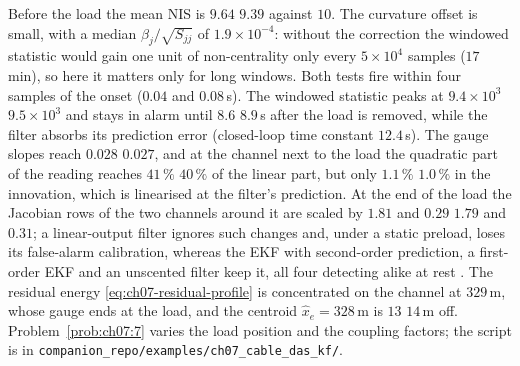 \documentclass[graybox,envcountchap]{style/SNmono}
\newcommand{\repopath}[1]{\texttt{#1}}
\providecommand{\DIFadd}[1]{{\protect\color{blue} #1}} %
\providecommand{\DIFdel}[1]{{\protect\color{red} #1}} %
\providecommand{\DIFaddbegin}{} %
\providecommand{\DIFaddend}{} %
\providecommand{\DIFdelbegin}{} %
\providecommand{\DIFdelend}{} %
\begin{document}
\begin{example}
Before the load the mean NIS is \DIFdelbegin \DIFdel{$9.64$ }\DIFdelend \DIFaddbegin \DIFadd{$9.39$ }\DIFaddend against $10$. The curvature offset is small, with a median $\beta_j/\sqrt{S_{jj}}$ of $1.9\times10^{-4}$: without the correction the windowed statistic would gain one unit of non-centrality only every $5\times10^{4}$ samples ($17$\,min), so here it matters only for long windows. Both tests fire within four samples of the onset ($0.04$ and $0.08$\,s). The windowed statistic peaks at \DIFdelbegin \DIFdel{$9.4\times10^{3}$ }\DIFdelend \DIFaddbegin \DIFadd{$9.5\times10^{3}$ }\DIFaddend and stays in alarm until \DIFdelbegin \DIFdel{$8.6$}\DIFdelend \DIFaddbegin \DIFadd{$8.9$}\DIFaddend \,s after the load is removed, while the filter absorbs its prediction error (closed-loop time constant $12.4$\,s). The gauge slopes reach \DIFdelbegin \DIFdel{$0.028$}\DIFdelend \DIFaddbegin \DIFadd{$0.027$}\DIFaddend , and at the channel next to the load the quadratic part of the reading reaches \DIFdelbegin \DIFdel{$41\,\%$ }\DIFdelend \DIFaddbegin \DIFadd{$40\,\%$ }\DIFaddend of the linear part, but only \DIFdelbegin \DIFdel{$1.1\,\%$ }\DIFdelend \DIFaddbegin \DIFadd{$1.0\,\%$ }\DIFaddend in the innovation, which is linearised at the filter's prediction. At the end of the load the Jacobian rows of the two channels around it are scaled by \DIFdelbegin \DIFdel{$1.81$ and $0.29$}\DIFdelend \DIFaddbegin \DIFadd{$1.79$ and $0.31$}\DIFaddend ; a linear-output filter \cite{fioravanti_cable_med_2026} ignores such changes and, under a static preload, loses its false-alarm calibration, whereas the EKF with second-order prediction, a first-order EKF and an unscented filter keep it, all four detecting alike at rest \cite{oliva_quadratic_ejc_2026}. The residual energy \eqref{eq:ch07-residual-profile} is concentrated on the channel at $329$\,m, whose gauge ends at the load, and the centroid $\hat x_e=328$\,m is \DIFdelbegin \DIFdel{$13$}\DIFdelend \DIFaddbegin \DIFadd{$14$}\DIFaddend \,m off. Problem~\ref{prob:ch07:7} varies the load position and the coupling factors; the script is in \repopath{companion\_\allowbreak repo/\allowbreak examples/\allowbreak ch07\_\allowbreak cable\_\allowbreak das\_\allowbreak kf/\allowbreak }.
\end{example}
\end{document}
